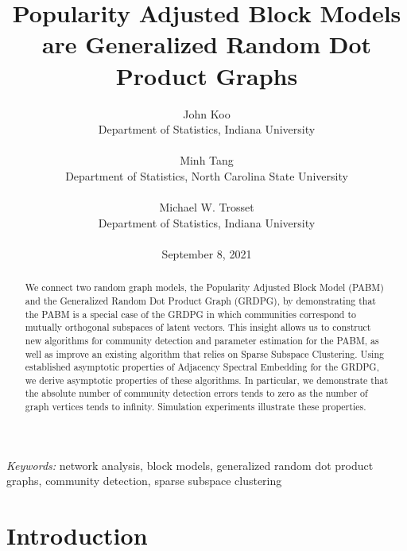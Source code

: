 \documentclass[12pt]{article}
\title{Popularity Adjusted Block Models are Generalized Random Dot Product Graphs}
\author{John Koo\\Department of Statistics, Indiana University\\ \\
Minh Tang\\Department of Statistics, North Carolina State University\\ \\
Michael W. Trosset\\Department of Statistics, Indiana University\\ \\
September 8, 2021}
\date{}
\def\spacingset#1{\renewcommand{\baselinestretch}%
{#1}\small\normalsize} \spacingset{1}
\providecommand{\tightlist}{%
  \setlength{\itemsep}{0pt}\setlength{\parskip}{0pt}}
\begin{document}
\maketitle

\begin{abstract}
We connect two random graph models, the Popularity Adjusted Block Model
(PABM) and the Generalized Random Dot Product Graph (GRDPG),
by demonstrating that the PABM is a special case of 
the GRDPG in which communities correspond to 
mutually orthogonal subspaces of latent vectors. 
This insight allows us to construct new algorithms for community detection
and parameter estimation for the PABM, 
as well as improve an existing algorithm 
that relies on Sparse Subspace Clustering. 
Using established asymptotic properties of 
Adjacency Spectral Embedding for the GRDPG, 
we derive asymptotic properties of these algorithms. 
In particular, we demonstrate that the absolute number of 
community detection errors tends to zero as 
the number of graph vertices tends to infinity. 
Simulation experiments illustrate these properties. 
\end{abstract}

\noindent%
{\it Keywords:} network analysis, block models, generalized random dot product graphs, community detection, sparse subspace clustering

\providecommand{\tightlist}{%
  \setlength{\itemsep}{0pt}\setlength{\parskip}{0pt}}
\newcommand{\diag}{\mathrm{diag}}
\newcommand{\tr}{\mathrm{Tr}}
\newcommand{\blockdiag}{\mathrm{blockdiag}}
\newcommand{\indep}{\stackrel{\mathrm{ind}}{\sim}}
\newcommand{\iid}{\stackrel{\mathrm{iid}}{\sim}}
\newcommand{\Bernoulli}{\mathrm{Bernoulli}}
\newcommand{\Betadist}{\mathrm{Beta}}
\newcommand{\BG}{\mathrm{BernoulliGraph}}
\newcommand{\PABM}{\mathrm{PABM}}
\newcommand{\RDPG}{\mathrm{RDPG}}
\newcommand{\GRDPG}{\mathrm{GRDPG}}
\newcommand{\Multinomial}{\mathrm{Multinomial}}
\newtheorem{theorem}{Theorem}
\newtheorem{lemma}{Lemma}
\newtheorem{proposition}{Proposition}
\theoremstyle{remark}
\newtheorem{remark}{Remark}
\theoremstyle{definition}
\newtheorem{definition}{Definition}
\newtheorem{example}{Example}
\newpage
\spacingset{1.5} %

\hypertarget{introduction}{%
\section{Introduction}\label{introduction}}
\end{document}
